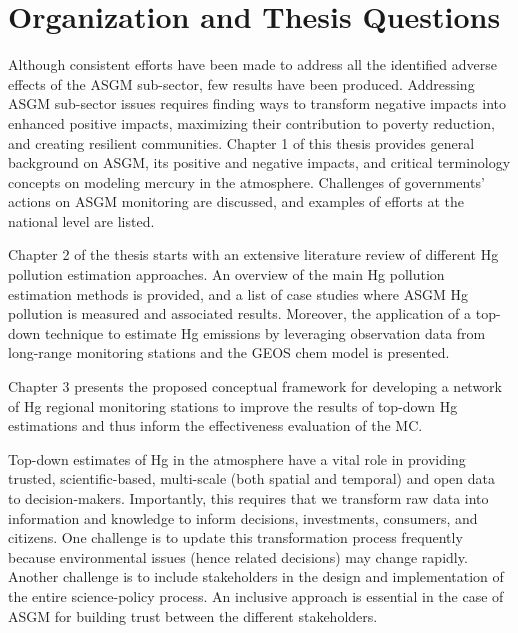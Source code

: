 \section{Organization and Thesis Questions}
Although consistent efforts have been made to address all the identified adverse effects of the ASGM sub-sector, few results have been produced. Addressing ASGM sub-sector issues requires finding ways to transform negative impacts into enhanced positive impacts, maximizing their contribution to poverty reduction, and creating resilient communities. Chapter 1 of this thesis provides general background on ASGM, its positive and negative impacts, and critical terminology concepts on modeling mercury in the atmosphere. Challenges of governments’ actions on ASGM monitoring are discussed, and examples of efforts at the national level are listed. 

Chapter 2 of the thesis starts with an extensive literature review of different Hg pollution estimation approaches. An overview of the main Hg pollution estimation methods is provided, and a list of case studies where ASGM Hg pollution is measured and associated results. Moreover, the application of a top-down technique to estimate Hg emissions by leveraging observation data from long-range monitoring stations and the GEOS chem model is presented.  

Chapter 3 presents the proposed conceptual framework for developing a network of Hg regional monitoring stations to improve the results of top-down Hg estimations and thus inform the effectiveness evaluation of the MC.

Top-down estimates of Hg in the atmosphere have a vital role in providing trusted, scientific-based, multi-scale (both spatial and temporal) and open data to decision-makers. Importantly, this requires that we transform raw data into information and knowledge to inform decisions, investments, consumers, and citizens. One challenge is to update this transformation process frequently because environmental issues (hence related decisions) may change rapidly. Another challenge is to include stakeholders in the design and implementation of the entire science-policy process. An inclusive approach is essential in the case of ASGM for building trust between the different stakeholders. 



